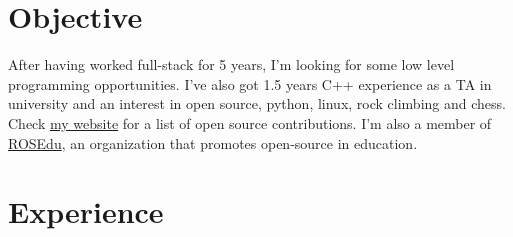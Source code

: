 \documentclass[line, margin]{resume}
\begin{document}
\renewcommand{\namefont}{ \LARGE \bf }


\address{\href{mailto:andrei@linux.com}{andrei@linux.com}}
\address{\href{http://andreipetre.ro}{andreipetre.ro}}

\begin{resume}



    \section{Objective}

After having worked full-stack for 5 years, I'm looking for some low level programming opportunities. I've also got 1.5 years C++ experience as a TA in university and an interest in open source, python, linux, rock climbing and chess. Check \href{http://andreipetre.ro}{my website} for a list of open source contributions. I'm also a member of \href{http://rosedu.org}{ROSEdu}, an organization that promotes open-source in education.

\section{Experience}


\end{resume}
\end{document}
